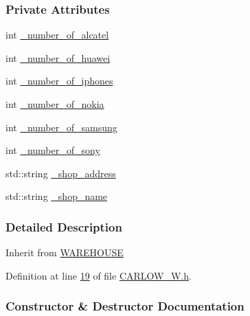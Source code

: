 \subsubsection*{Private Attributes}
\begin{DoxyCompactItemize}
\item 
int \hyperlink{class_c_a_r_l_o_w___w_acf1f9888b2ac011cd0e8bb49b10abd91_acf1f9888b2ac011cd0e8bb49b10abd91}{\+\_\+number\+\_\+of\+\_\+alcatel}
\item 
int \hyperlink{class_c_a_r_l_o_w___w_acc2837ed943bb51134e5878e818970fd_acc2837ed943bb51134e5878e818970fd}{\+\_\+number\+\_\+of\+\_\+huawei}
\item 
int \hyperlink{class_c_a_r_l_o_w___w_aff9e9a986b6390d6fa51f52d43a8c0e8_aff9e9a986b6390d6fa51f52d43a8c0e8}{\+\_\+number\+\_\+of\+\_\+iphones}
\item 
int \hyperlink{class_c_a_r_l_o_w___w_ac4c7e47711cc4c9e0bc01fc37cabe7d1_ac4c7e47711cc4c9e0bc01fc37cabe7d1}{\+\_\+number\+\_\+of\+\_\+nokia}
\item 
int \hyperlink{class_c_a_r_l_o_w___w_ae47f54289c630e38341ce8b2c8decf0f_ae47f54289c630e38341ce8b2c8decf0f}{\+\_\+number\+\_\+of\+\_\+samsung}
\item 
int \hyperlink{class_c_a_r_l_o_w___w_a080de2e63290db84a0b9898682b74f6e_a080de2e63290db84a0b9898682b74f6e}{\+\_\+number\+\_\+of\+\_\+sony}
\item 
std\+::string \hyperlink{class_c_a_r_l_o_w___w_acaa886b26f5a60d500f13709340d34cf_acaa886b26f5a60d500f13709340d34cf}{\+\_\+shop\+\_\+address}
\item 
std\+::string \hyperlink{class_c_a_r_l_o_w___w_ad3ae4ca82f06287d8ad5bec07a43561a_ad3ae4ca82f06287d8ad5bec07a43561a}{\+\_\+shop\+\_\+name}
\end{DoxyCompactItemize}


\subsubsection{Detailed Description}
Inherit from \hyperlink{class_w_a_r_e_h_o_u_s_e}{W\+A\+R\+E\+H\+O\+U\+SE} 

Definition at line \hyperlink{_c_a_r_l_o_w___w_8h_source_l00019}{19} of file \hyperlink{_c_a_r_l_o_w___w_8h_source}{C\+A\+R\+L\+O\+W\+\_\+\+W.\+h}.



\subsubsection{Constructor \& Destructor Documentation}
